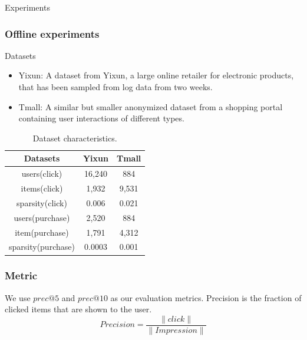 \documentclass[xetex,mathserif,serif]{beamer}
\begin{document}
\begin{section}{Experiments}
  \begin{frame}
    \frametitle{Offline experiments}
    \begin{block}
      {Datasets}
      \begin{itemize}
      \item Yixun: A dataset from Yixun, a large online retailer for electronic products, that has been sampled from log data from two weeks.
      \item Tmall: A similar but smaller anonymized dataset from a shopping portal containing user interactions of different types.
      \end{itemize}
      \begin{table}
        \begin{center}
          \begin{tabular}{c c c}
            \hline
            Datasets & Yixun & Tmall\\
            \hline
            users(click) & 16,240 & 884\\
            items(click) & 1,932 & 9,531\\
            sparsity(click) & 0.006 & 0.021\\
            \hline
            users(purchase) & 2,520& 884\\
            item(purchase) & 1,791& 4,312\\
            sparsity(purchase) & 0.0003 & 0.001\\
            \hline
          \end{tabular}
        \end{center}
        \caption{Dataset characteristics.}
        \label{dataset}


      \end{table}
    \end{block}
  \end{frame}
  \begin{frame}
    \frametitle{Metric}
    We use $prec@5$ and $prec@10$ as our evaluation metrics. Precision is the fraction of clicked items that are shown to the user. $$Precision = \frac{\|click\|}{\|Impression\|}$$


\end{frame}
\end{section}
\end{document}
